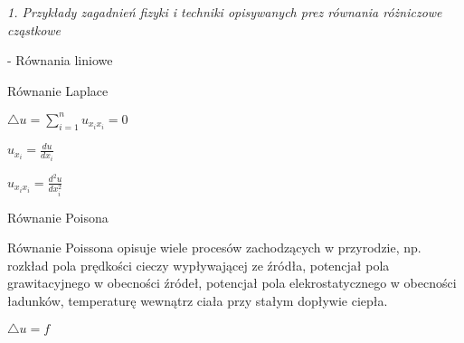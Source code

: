 \textit{1. Przykłady zagadnień fizyki i techniki opisywanych prez równania różniczowe cząstkowe}


- Równania liniowe

Równanie Laplace

$ \bigtriangleup u = \sum_{i=1}^{n} u_{x_ix_i} =0$

$ u_{x_i} = \frac{du}{dx_i}$

$ u_{x_i x_i} = \frac{d^2u}{dx_i^2}$

Równanie Poisona

Równanie Poissona opisuje wiele procesów zachodzących w przyrodzie, np. rozkład pola prędkości cieczy wypływającej ze źródła, potencjał pola grawitacyjnego w obecności źródeł, potencjał pola elekrostatycznego w obecności ładunków, temperaturę wewnątrz ciała przy stałym dopływie ciepła.

$ \bigtriangleup u =f$
